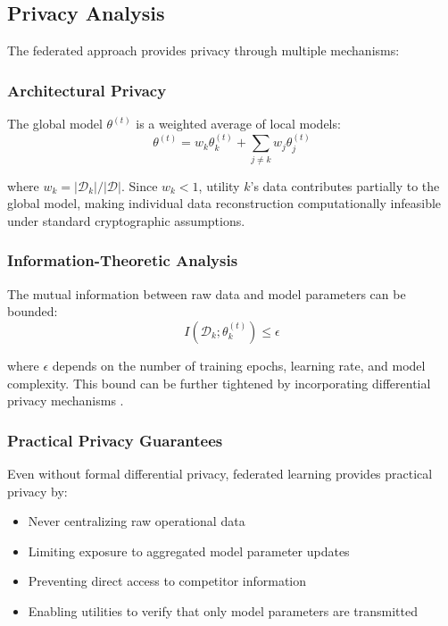 \documentclass[journal,10pt]{IEEEtran}
\begin{document}
\subsection{Privacy Analysis}

The federated approach provides privacy through multiple mechanisms:

\subsubsection{Architectural Privacy}
The global model $\theta^{(t)}$ is a weighted average of local models:
\begin{equation}
\theta^{(t)} = w_k \theta_k^{(t)} + \sum_{j \neq k} w_j \theta_j^{(t)}
\end{equation}

where $w_k = |\mathcal{D}_k| / |\mathcal{D}|$. Since $w_k < 1$, utility $k$'s data contributes partially to the global model, making individual data reconstruction computationally infeasible under standard cryptographic assumptions.

\subsubsection{Information-Theoretic Analysis}
The mutual information between raw data and model parameters can be bounded:
\begin{equation}
I(\mathcal{D}_k; \theta_k^{(t)}) \leq \epsilon
\end{equation}

where $\epsilon$ depends on the number of training epochs, learning rate, and model complexity. This bound can be further tightened by incorporating differential privacy mechanisms \cite{abadi2016deep}.

\subsubsection{Practical Privacy Guarantees}
Even without formal differential privacy, federated learning provides practical privacy by:
\begin{itemize}
    \item Never centralizing raw operational data
    \item Limiting exposure to aggregated model parameter updates
    \item Preventing direct access to competitor information
    \item Enabling utilities to verify that only model parameters are transmitted
\end{itemize}
\end{document}
